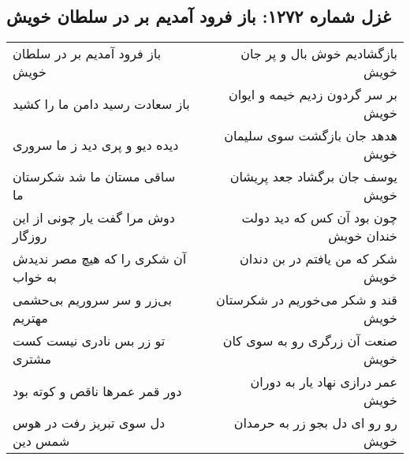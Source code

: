 \begin{center}
\section*{غزل شماره ۱۲۷۲: باز فرود آمدیم بر در سلطان خویش}
\label{sec:1272}
\begin{longtable}{l p{0.5cm} r}
باز فرود آمدیم بر در سلطان خویش
&&
بازگشادیم خوش بال و پر جان خویش
\\
باز سعادت رسید دامن ما را کشید
&&
بر سر گردون زدیم خیمه و ایوان خویش
\\
دیده دیو و پری دید ز ما سروری
&&
هدهد جان بازگشت سوی سلیمان خویش
\\
ساقی مستان ما شد شکرستان ما
&&
یوسف جان برگشاد جعد پریشان خویش
\\
دوش مرا گفت یار چونی از این روزگار
&&
چون بود آن کس که دید دولت خندان خویش
\\
آن شکری را که هیچ مصر ندیدش به خواب
&&
شکر که من یافتم در بن دندان خویش
\\
بی‌زر و سر سروریم بی‌حشمی مهتریم
&&
قند و شکر می‌خوریم در شکرستان خویش
\\
تو زر بس نادری نیست کست مشتری
&&
صنعت آن زرگری رو به سوی کان خویش
\\
دور قمر عمرها ناقص و کوته بود
&&
عمر درازی نهاد یار به دوران خویش
\\
دل سوی تبریز رفت در هوس شمس دین
&&
رو رو ای دل بجو زر به حرمدان خویش
\\
\end{longtable}
\end{center}
